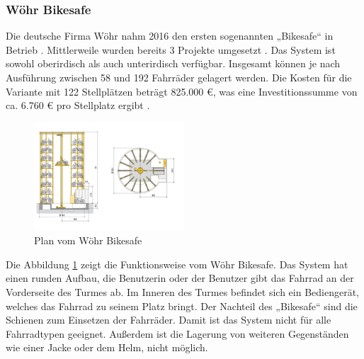 \subsubsection{Wöhr Bikesafe}
Die deutsche Firma Wöhr nahm 2016 den ersten sogenannten „Bikesafe“ in Betrieb . Mittlerweile wurden bereits 3 Projekte umgesetzt . Das System ist sowohl oberirdisch als auch unterirdisch verfügbar. Insgesamt können je nach Ausführung zwischen 58 und 192 Fahrräder gelagert werden. Die Kosten für die Variante mit 122 Stellplätzen beträgt 825.000 \euro{}, was eine Investitionssumme von ca. 6.760 \euro{} pro Stellplatz ergibt \cite*{richtpreisangebot}.

\begin{figure}[H]
    \centering
    \includegraphics[width=0.5\textwidth]{images/bikesafe.png}
    \caption{Plan vom Wöhr Bikesafe }
    \label{fig:bikesafe}
\end{figure}

\noindent Die Abbildung \ref{fig:bikesafe} zeigt die Funktionsweise vom Wöhr Bikesafe. Das System hat einen runden Aufbau, die Benutzerin oder der Benutzer gibt das Fahrrad an der Vorderseite des Turmes ab. Im Inneren des Turmes befindet sich ein Bediengerät, welches das Fahrrad zu seinem Platz bringt.
\noindent Der Nachteil des „Bikesafe“ sind die Schienen zum Einsetzen der Fahrräder. Damit ist das System nicht für alle Fahrradtypen geeignet. Außerdem ist die Lagerung von weiteren Gegenständen wie einer Jacke oder dem Helm, nicht möglich.
